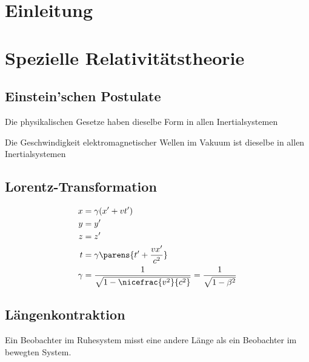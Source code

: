 
\section{Einleitung} %
\section{Spezielle Relativitätstheorie} %
	\subsection{Einstein'schen Postulate} %
		\begin{tightitemize}
			\item Die physikalischen Gesetze haben dieselbe Form in allen Inertialsystemen
			\item Die Geschwindigkeit elektromagnetischer Wellen im Vakuum ist dieselbe in allen Inertialsystemen
		\end{tightitemize}
	\subsection{Lorentz-Transformation} %
		\begin{center}
			
		\end{center}
		\begin{align*}
			x &= \gamma(x' + vt') \\
			y &= y' \\
			z &= z' \\
			t &= \gamma\parens{t' + \frac{v x'}{c^2}} \\
			\gamma &= \frac{1}{\sqrt{1- \nicefrac{v^2}{c^2}}} = \frac{1}{\sqrt{1-\beta^2}}
		\end{align*}
	\subsection{Längenkontraktion} %
		Ein Beobachter im Ruhesystem misst eine andere Länge als ein Beobachter im
		bewegten System.
		
